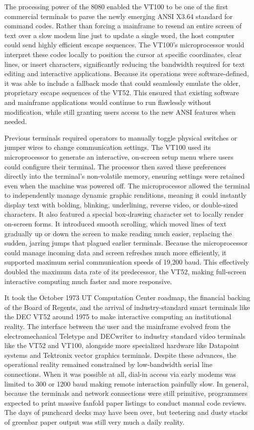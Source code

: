 The processing power of the 8080 enabled the VT100 to be one of the first commercial terminals to parse the newly emerging ANSI X3.64 standard for command codes. Rather than forcing a mainframe to resend an entire screen of text over a slow modem line just to update a single word, the host computer could send highly efficient escape sequences. The VT100’s microprocessor would interpret these codes locally to position the cursor at specific coordinates, clear lines, or insert characters, significantly reducing the bandwidth required for text editing and interactive applications. Because its operations were software-defined, it was able to include a fallback mode that could seamlessly emulate the older, proprietary escape sequences of the VT52. This ensured that existing software and mainframe applications would continue to run flawlessly without modification, while still granting users access to the new ANSI features when needed. 

Previous terminals required operators to manually toggle physical switches or jumper wires to change communication settings. The VT100 used its microprocessor to generate an interactive, on-screen setup menu where users could configure their terminal. The processor then saved these preferences directly into the terminal's non-volatile memory, ensuring settings were retained even when the machine was powered off. The microprocessor allowed the terminal to independently manage dynamic graphic renditions, meaning it could instantly display text with bolding, blinking, underlining, reverse video, or double-sized characters. It also featured a special box-drawing character set to locally render on-screen forms. It introduced smooth scrolling, which moved lines of text gradually up or down the screen to make reading much easier, replacing the sudden, jarring jumps that plagued earlier terminals. Because the microprocessor could manage incoming data and screen refreshes much more efficiently, it supported maximum serial communication speeds of 19,200 baud. This effectively doubled the maximum data rate of its predecessor, the VT52, making full-screen interactive computing much faster and more responsive.

It took the October 1973 UT Computation Center roadmap, the financial backing of the Board of Regents, and the arrival of industry-standard smart terminals like the DEC VT52 around 1975 to make interactive computing an institutional reality. The interface between the user and the mainframe evolved from the electromechanical Teletype and DECwriter to industry standard video terminals like the VT52 and VT100, alongside more specialized hardware like Datapoint systems and Tektronix vector graphics terminals. Despite these advances, the operational reality remained constrained by low-bandwidth serial line connections. When it was possible at all, dial-in access via early modems was limited to 300 or 1200 baud making remote interaction painfully slow. In general, because the terminals and network connections were still primitive, programmers expected to print massive fanfold paper listings to conduct manual code reviews. The days of punchcard decks may have been over, but teetering and dusty stacks of greenbar paper output was still very much a daily reality.

